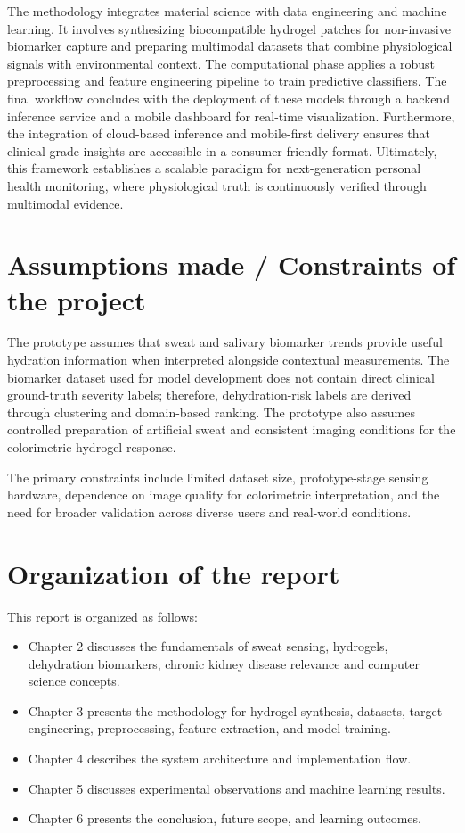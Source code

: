 The methodology integrates material science with data engineering and machine learning. It involves synthesizing biocompatible hydrogel patches for non-invasive biomarker capture and preparing multimodal datasets that combine physiological signals with environmental context. The computational phase applies a robust preprocessing and feature engineering pipeline to train predictive classifiers. The final workflow concludes with the deployment of these models through a backend inference service and a mobile dashboard for real-time visualization. Furthermore, the integration of cloud-based inference and mobile-first delivery ensures that clinical-grade insights are accessible in a consumer-friendly format. Ultimately, this framework establishes a scalable paradigm for next-generation personal health monitoring, where physiological truth is continuously verified through multimodal evidence.

\section[Assumptions made / Constraints of the project]{\textbf{Assumptions made / Constraints of the project}}

The prototype assumes that sweat and salivary biomarker trends provide useful hydration information when interpreted alongside contextual measurements. The biomarker dataset used for model development does not contain direct clinical ground-truth severity labels; therefore, dehydration-risk labels are derived through clustering and domain-based ranking. The prototype also assumes controlled preparation of artificial sweat and consistent imaging conditions for the colorimetric hydrogel response.

The primary constraints include limited dataset size, prototype-stage sensing hardware, dependence on image quality for colorimetric interpretation, and the need for broader validation across diverse users and real-world conditions.

\section[Organization of the report]{\textbf{Organization of the report}}

This report is organized as follows:
\begin{itemize}
\item Chapter 2 discusses the fundamentals of sweat sensing, hydrogels, dehydration biomarkers, chronic kidney disease relevance and computer science concepts.
\item Chapter 3 presents the methodology for hydrogel synthesis, datasets, target engineering, preprocessing, feature extraction, and model training.
\item Chapter 4 describes the system architecture and implementation flow.
\item Chapter 5 discusses experimental observations and machine learning results.
\item Chapter 6 presents the conclusion, future scope, and learning outcomes.
\end{itemize}
